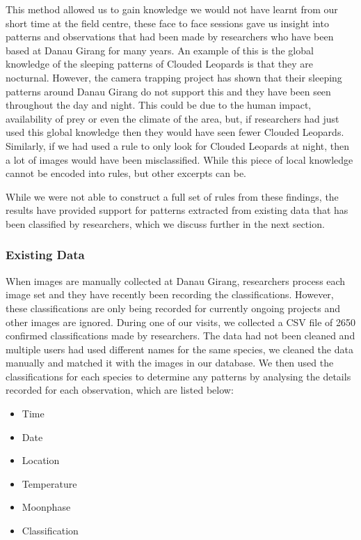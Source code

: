 			This method allowed us to gain knowledge we would not have learnt from our short time at the field centre, these face to face sessions gave us insight into patterns and observations that had been made by researchers who have been based at Danau Girang for many years. An example of this is the global knowledge of the sleeping patterns of Clouded Leopards is that they are nocturnal. However, the camera trapping project has shown that their sleeping patterns around Danau Girang do not support this and they have been seen throughout the day and night. This could be due to the human impact, availability of prey or even the climate of the area, but, if researchers had just used this global knowledge then they would have seen fewer Clouded Leopards. Similarly, if we had used a rule to only look for Clouded Leopards at night, then a lot of images would have been misclassified. While this piece of local knowledge cannot be encoded into rules, but other excerpts can be.

			While we were not able to construct a full set of rules from these findings, the results have provided support for patterns extracted from existing data that has been classified by researchers, which we discuss further in the next section. 
			
			\subsubsection{Existing Data}
			When images are manually collected at Danau Girang, researchers process each image set and they have recently been recording the classifications. However, these classifications are only being recorded for currently ongoing projects and other images are ignored. During one of our visits, we collected a CSV file of 2650 confirmed classifications made by researchers. The data had not been cleaned and multiple users had used different names for the same species, we cleaned the data manually and matched it with the images in our database.
			We then used the classifications for each species to determine any patterns by analysing the details recorded for each observation, which are listed below:
			\begin{itemize}
				\item Time
				\item Date
				\item Location
				\item Temperature
				\item Moonphase
				\item Classification
			\end{itemize}
			
